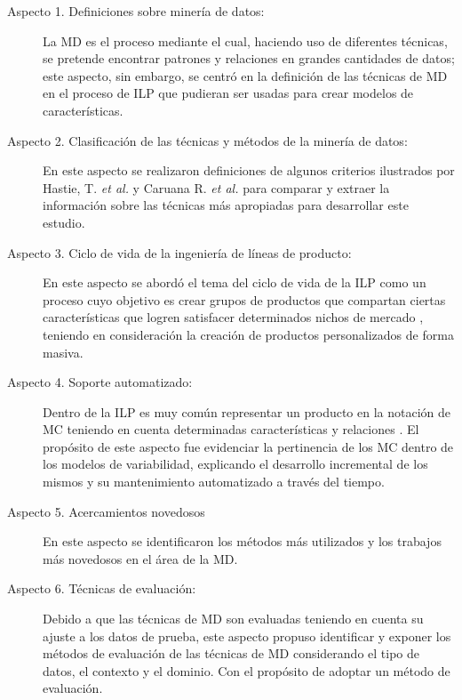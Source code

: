 \begin{description}

\item[Aspecto 1. Definiciones sobre minería de datos:]La MD es el proceso mediante el cual, haciendo uso de diferentes técnicas, se pretende encontrar patrones y relaciones en grandes cantidades de datos\cite{Izenman2006}; este aspecto, sin embargo, se centró en la definición de las técnicas de MD en el proceso de ILP que pudieran ser usadas para crear modelos de características.

\item[Aspecto 2. Clasificación de las técnicas y métodos de la minería de datos:] En este aspecto se realizaron definiciones de algunos criterios ilustrados por Hastie, T. \textit{et al.} \cite{Hastie2009} y Caruana R. \textit{et al.} \cite{Caruana2006} para comparar y extraer la información sobre las técnicas más apropiadas para desarrollar este estudio.

\item[Aspecto 3. Ciclo de vida de la ingeniería de líneas de producto:] En este aspecto se abordó el tema del ciclo de vida de la ILP como un proceso cuyo objetivo es crear grupos de productos que compartan ciertas características que logren satisfacer determinados nichos de mercado \cite{VanDerLinden2007}, teniendo en consideración la creación de productos personalizados de forma masiva.


\item[Aspecto 4. Soporte automatizado:] Dentro de la ILP es muy común representar un producto en la notación de MC teniendo en cuenta determinadas características y relaciones \cite{Benavides2010}. El propósito de este aspecto fue evidenciar la pertinencia de los MC dentro de los modelos de variabilidad, explicando el desarrollo incremental de los mismos y su mantenimiento automatizado a través del tiempo. 

\item[Aspecto 5. Acercamientos novedosos] En este aspecto se identificaron los métodos más utilizados y los trabajos más novedosos en el área de la MD.

\item[Aspecto 6. Técnicas de evaluación:] Debido a que las técnicas de MD son evaluadas teniendo en cuenta su ajuste a los datos de prueba, este aspecto propuso identificar y exponer los métodos de evaluación de las técnicas de MD considerando el tipo de datos, el contexto y el dominio. Con el propósito de adoptar un método de evaluación.


\end{description}
